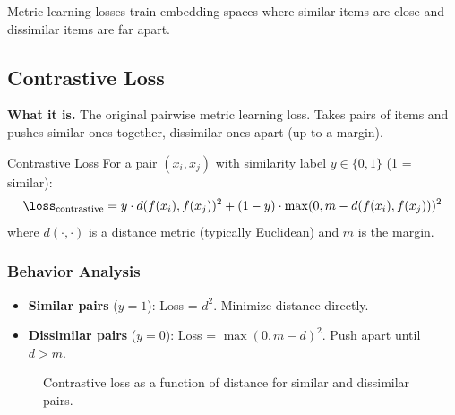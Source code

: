 Metric learning losses train embedding spaces where similar items are close and dissimilar items are far apart.

\subsection{Contrastive Loss}

\textbf{What it is.} The original pairwise metric learning loss. Takes pairs of items and pushes similar ones together, dissimilar ones apart (up to a margin).

\begin{mathresult}{Contrastive Loss}
For a pair $(x_i, x_j)$ with similarity label $y \in \{0, 1\}$ (1 = similar):
\begin{equation}
\loss_{\text{contrastive}} = y \cdot d(f(x_i), f(x_j))^2 + (1-y) \cdot \max(0, m - d(f(x_i), f(x_j)))^2
\end{equation}
where $d(\cdot, \cdot)$ is a distance metric (typically Euclidean) and $m$ is the margin.
\end{mathresult}

\subsubsection{Behavior Analysis}

\begin{itemize}
    \item \textbf{Similar pairs} ($y=1$): Loss = $d^2$. Minimize distance directly.
    \item \textbf{Dissimilar pairs} ($y=0$): Loss = $\max(0, m-d)^2$. Push apart until $d > m$.
\end{itemize}

\begin{figure}[H]
\centering
{}
\caption{Contrastive loss as a function of distance for similar and dissimilar pairs.}
\end{figure}

